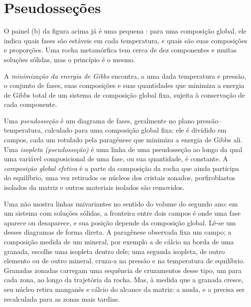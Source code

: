 \section{Pseudosseções}\label{sec:b3:petrological-thermodynamics:pseudosections}

O painel (b) da figura acima já é uma pequena : para uma composição
global, ele indica quais fases são estáveis em cada temperatura, e quais são
suas composições e proporções. Uma rocha metamórfica tem cerca de dez
componentes e muitas soluções sólidas, mas o princípio é o mesmo.

\begin{definition}\label{def:b3:petrological-thermodynamics:minimisation}
A \emph{minimização da energia de Gibbs} encontra, a
uma dada temperatura e pressão, o conjunto de fases, suas composições e
suas quantidades que minimiza a energia de Gibbs total de um sistema de
composição global fixa, sujeita à conservação de cada componente.
\end{definition}

\begin{definition}\label{def:b3:petrological-thermodynamics:pseudosection}
Uma \emph{pseudosseção} é um diagrama de fases, geralmente no
plano pressão--temperatura, calculado para uma composição global fixa: ele é
dividido em campos, cada um rotulado pela paragênese que minimiza a
energia de Gibbs ali. Uma \emph{isopleta (pseudosseção)}
é uma linha de uma pseudosseção ao longo da qual uma variável
composicional de uma fase, ou sua quantidade, é constante. A \emph{composição global
efetiva} é a parte da composição da rocha que
ainda participa do equilíbrio, uma vez retirados os núcleos dos cristais zonados,
porfiroblastos isolados da matriz e outros materiais isolados
são removidos.
\end{definition}

Uma  não mostra linhas univariantes no sentido do volume do segundo
ano: em um sistema com soluções sólidas, a fronteira entre dois campos é
onde uma fase aparece ou desaparece, e sua posição depende da composição
global. Lê-se um desses diagramas de forma direta. A paragênese observada
fixa um campo; a composição medida de um mineral, por exemplo a de cálcio
na borda de uma granada, escolhe uma isopleta dentro dele; uma segunda isopleta,
de outro elemento ou de outro mineral, cruza-a na pressão e na temperatura
de equilíbrio. Granadas zonadas carregam uma sequência de cruzamentos desse
tipo, um para cada zona, ao longo da trajetória da rocha. Mas, à medida que
a granada cresce, seu núcleo retira manganês e cálcio do alcance da matriz:
a  muda, e a  precisa ser recalculada
para as zonas mais tardias.

